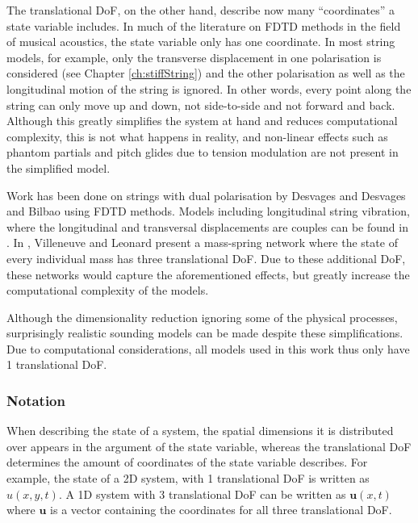The translational DoF, on the other hand, describe now many ``coordinates'' a state variable includes. 
In much of the literature on FDTD methods in the field of musical acoustics, the state variable only has one coordinate. In most string models, for example, only the transverse displacement in one polarisation is considered (see Chapter \ref{ch:stiffString}) and the other polarisation as well as the longitudinal motion of the string is ignored. In other words, every point along the string can only move up and down, not side-to-side and not forward and back. Although this greatly simplifies the system at hand and reduces computational complexity, this is not what happens in reality, and non-linear effects such as phantom partials and pitch glides due to tension modulation are not present in the simplified model. 

Work has been done on strings with dual polarisation by Desvages \cite{Desvages2018} and Desvages and Bilbao \cite{Desvages2016} using FDTD methods. Models including longitudinal string vibration, where the longitudinal and transversal displacements are couples can be found in \cite{theBible}.
In \cite{Villeneuve2019}, Villeneuve and Leonard present a mass-spring network where the state of every individual mass has three translational DoF. Due to these additional DoF, these networks would capture the aforementioned effects, but greatly increase the computational complexity of the models. 

Although the dimensionality reduction ignoring some of the physical processes, surprisingly realistic sounding models can be made despite these simplifications. Due to computational considerations, all models used in this work thus only have 1 translational DoF.

\subsubsection{Notation}
When describing the state of a system, the spatial dimensions it is distributed over appears in the argument of the state variable, whereas the translational DoF determines the amount of coordinates of the state variable describes. For example, the state of a 2D system, with 1 translational DoF is written as $u(x,y,t)$. A 1D system with 3 translational DoF can be written as $\mathbf{u}(x,t)$ where $\mathbf{u}$ is a vector containing the coordinates for all three translational DoF.  


